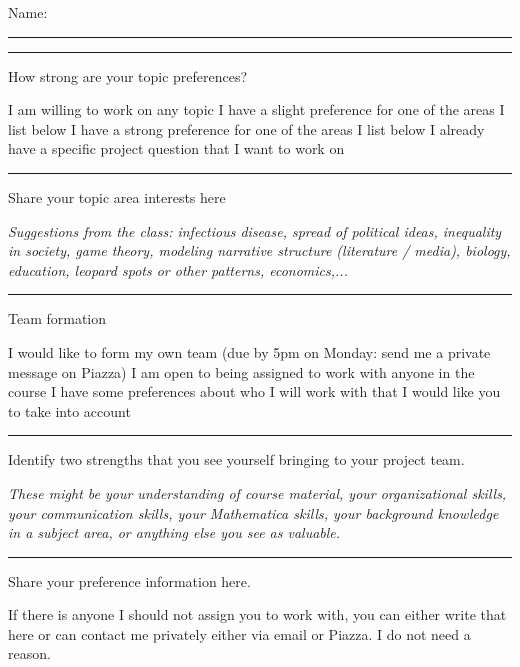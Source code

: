\documentclass[12pt,letterpaper,noanswers]{exam}
\begin{document}
 \pdfpageheight 11in 
  \pdfpagewidth 8.5in

Name: \rule{2.5in}{0.5pt}
\vspace{4mm}
\vspace{0.2cm}

\hrule
\vspace{0.2cm}
How strong are your topic preferences?
\begin{checkboxes}
 \choice I am willing to work on any topic 
 \choice I have a slight preference for one of the areas I list below
 \choice I have a strong preference for one of the areas I list below
 \choice I already have a specific project question that I want to work on
\end{checkboxes}

\vspace{0.2cm}

\hrule
\vspace{0.2cm}

Share your topic area interests here

\emph{Suggestions from the class: infectious disease, spread of political ideas, inequality in society, game theory, modeling narrative structure (literature / media), biology, education, leopard spots or other patterns, economics,...}
\vspace{2in}






\vspace{0.2cm}

\hrule
\vspace{0.2cm}

\noindent Team formation

\begin{checkboxes}
 \choice I would like to form my own team (due by 5pm on Monday: send me a private message on Piazza) 
 \choice I am open to being assigned to work with anyone in the course
 \choice I have some preferences about who I will work with that I would like you to take into account
\end{checkboxes}

\vspace{0.2cm}

\hrule
\vspace{0.2cm}
\noindent Identify two strengths that you see yourself bringing to your project team.

\emph{These might be your understanding of course material, your organizational skills, your communication skills, your Mathematica skills, your background knowledge in a subject area, or anything else you see as valuable.}
\vfill
\vspace{0.2cm}

\hrule
\vspace{0.2cm}

\noindent Share your preference information here.  
\vfill

\noindent If there is anyone I should not assign you to work with, you can either write that here or can contact me privately either via email or Piazza.  I do not need a reason.
\end{document}

